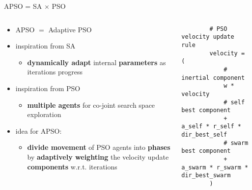 \documentclass[11pt,aspectratio=169]{beamer}
\begin{document}
%
%

\begin{frame}[fragile]{APSO = SA $\times$ PSO}
    \begin{columns}
    \begin{column}{0.45\textwidth}
        \begin{itemize}
            \item APSO $=$ Adaptive PSO
            \item inspiration from SA
            \begin{itemize}
                \item \textbf{dynamically adapt} internal \textbf{parameters} as iterations progress
            \end{itemize}
            \item inspiration from PSO
            \begin{itemize}
                \item \textbf{multiple agents} for co-joint search space exploration
            \end{itemize}
            \item idea for APSO:
            \begin{itemize}
                \item \textbf{divide movement} of PSO agents into \textbf{phases} by \textbf{adaptively weighting} the velocity update \textbf{components} w.r.t. iterations
            \end{itemize}
        \end{itemize}
    \end{column}

    \begin{column}{0.6\textwidth}
        \begin{verbatim}
        # PSO velocity update rule
        velocity = (
            # inertial component
            w * velocity
            # self best component
            + a_self * r_self * dir_best_self
            # swarm best component
            + a_swarm * r_swarm * dir_best_swarm
        )
        \end{verbatim}
    \end{column}
    \end{columns}
\end{frame}

%
%
\end{document}
